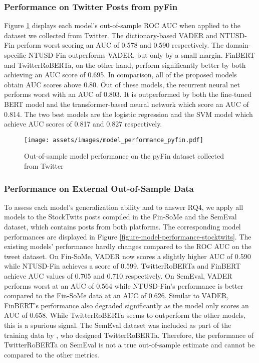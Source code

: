 \subsubsection{Performance on Twitter Posts from pyFin}
Figure \ref{figure-model-performance-twitter} displays each model's out-of-sample ROC AUC when applied to the dataset we collected from Twitter. The dictionary-based VADER and NTUSD-Fin perform worst scoring an AUC of 0.578 and 0.590 respectively. The domain-specific NTUSD-Fin outperforms VADER, but only by a small margin. FinBERT and TwitterRoBERTa, on the other hand, perform significantly better by both achieving an AUC score of 0.695.\newline
In comparison, all of the proposed models obtain AUC scores above 0.80. Out of these models, the recurrent neural net performs worst with an AUC of 0.803. It is outperformed by both the fine-tuned BERT model and the transformer-based neural network which score an AUC of 0.814. The two best models are the logistic regression and the SVM model which achieve AUC scores of 0.817 and 0.827 respectively.


\begin{figure}[!ht]
	\texttt{[image: assets/images/model\_performance\_pyfin.pdf]}	
	\caption{Out-of-sample model performance on the pyFin dataset collected from Twitter}
	\label{figure-model-performance-twitter}
\end{figure}



\subsubsection{Performance on External Out-of-Sample Data}
\label{section-modelperf-on-finsome}
To assess each model's generalization ability and to answer RQ4, we apply all models to the StockTwits posts compiled in the Fin-SoMe and the SemEval dataset, which contains posts from both platforms. The corresponding model performances are displayed in Figure \ref{figure-model-performance-stocktwits}. The existing models' performance hardly changes compared to the ROC AUC on the tweet dataset.\newline
On Fin-SoMe, VADER now scores a slightly higher AUC of 0.590 while NTUSD-Fin achieves a score of 0.599. TwitterRoBERTa and FinBERT achieve AUC values of 0.705 and 0.710 respectively.\newline
On SemEval, VADER performs worst at an AUC of 0.564 while NTUSD-Fin's performance is better compared to the Fin-SoMe data at an AUC of 0.626. Similar to VADER, FinBERT's performance also degraded significantly as the model only scores an AUC of 0.658. While TwitterRoBERTa seems to outperform the other models, this is a spurious signal. The SemEval dataset was included as part of the training data by , who designed TwitterRoBERTa. Therefore, the performance of TwitterRoBERTa on SemEval is not a true out-of-sample estimate and cannot be compared to the other metrics.

